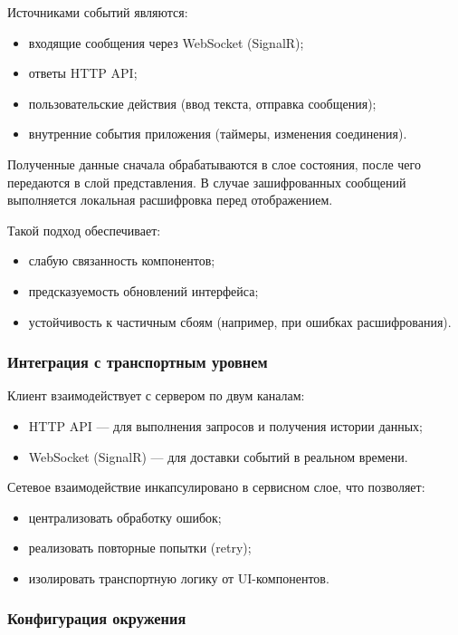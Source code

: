\documentclass{article}
\begin{document}
Источниками событий являются:
\begin{itemize}
\item входящие сообщения через WebSocket (SignalR);
\item ответы HTTP API;
\item пользовательские действия (ввод текста, отправка сообщения);
\item внутренние события приложения (таймеры, изменения соединения).
\end{itemize}

Полученные данные сначала обрабатываются в слое состояния, после чего передаются в слой представления. В случае зашифрованных сообщений выполняется локальная расшифровка перед отображением.

Такой подход обеспечивает:
\begin{itemize}
\item слабую связанность компонентов;
\item предсказуемость обновлений интерфейса;
\item устойчивость к частичным сбоям (например, при ошибках расшифрования).
\end{itemize}

\subsubsection{Интеграция с транспортным уровнем}

Клиент взаимодействует с сервером по двум каналам:
\begin{itemize}
\item HTTP API — для выполнения запросов и получения истории данных;
\item WebSocket (SignalR) — для доставки событий в реальном времени.
\end{itemize}

Сетевое взаимодействие инкапсулировано в сервисном слое, что позволяет:
\begin{itemize}
\item централизовать обработку ошибок;
\item реализовать повторные попытки (retry);
\item изолировать транспортную логику от UI-компонентов.
\end{itemize}

\subsubsection{Конфигурация окружения}
\end{document}

